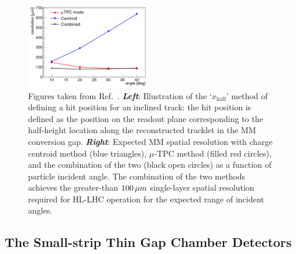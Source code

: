\begin{figure}[!htb]
    \begin{center}
        \includegraphics[width=0.48\textwidth]{figures/nsw/tpc_vs_centroid_res}
        \caption{
            Figures taken from Ref.~\cite{NSWTDR}.
            \textbf{\textit{Left}}: Illustration of the `$x_{\text{half}}$' method of defining a hit position for
                an inclined track: the hit position is defined as the position on the readout plane
                corresponding to the half-height location along the reconstructed tracklet in the MM conversion gap.
            \textbf{\textit{Right}}: Expected MM spatial resolution with charge centroid method (blue triangles), $\mu$-TPC
                method (filled red circles), and the combination of the two (black open circles) as a function
                of particle incident angle.
                The combination of the two methods achieves the greater-than $100\,\mu m$ single-layer spatial resolution
                required for HL-LHC operation for the expected range of incident angles.
        }
        \label{fig:mm_tpc_hit_loc}
    \end{center}
\end{figure}

\subsection{The Small-strip Thin Gap Chamber Detectors}
\label{sec:nsw_stgc}

